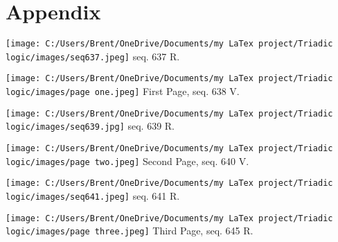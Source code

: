 \documentclass[12pt]{article}
\begin{document}
\pagebreak
\section{Appendix}

\begin{center}
\texttt{[image: C:/Users/Brent/OneDrive/Documents/my LaTex project/Triadic logic/images/seq637.jpeg]}
seq. 637 R.
\end{center}

\begin{center}
\texttt{[image: C:/Users/Brent/OneDrive/Documents/my LaTex project/Triadic logic/images/page one.jpeg]}
First Page, seq. 638 V.
\end{center}

\begin{center}
\texttt{[image: C:/Users/Brent/OneDrive/Documents/my LaTex project/Triadic logic/images/seq639.jpg]}
seq. 639 R.
\end{center}

\begin{center}
\texttt{[image: C:/Users/Brent/OneDrive/Documents/my LaTex project/Triadic logic/images/page two.jpeg]}
Second Page, seq. 640 V.
\end{center}

\begin{center}
\texttt{[image: C:/Users/Brent/OneDrive/Documents/my LaTex project/Triadic logic/images/seq641.jpeg]}
seq. 641 R.
\end{center}

\begin{center}
\texttt{[image: C:/Users/Brent/OneDrive/Documents/my LaTex project/Triadic logic/images/page three.jpeg]}
Third Page, seq. 645 R.
\end{center}



\end{document}
